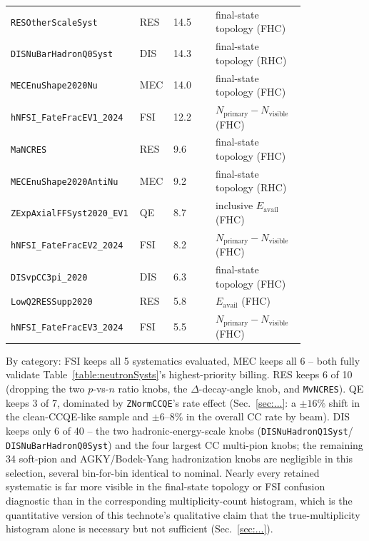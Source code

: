 \begin{table}[htbp]
\begin{tabular}{p{0.28\linewidth} p{0.10\linewidth} p{0.14\linewidth} p{0.30\linewidth}}
        \texttt{RESOtherScaleSyst}         & RES & 14.5  & final-state topology (FHC) \\
        \texttt{DISNuBarHadronQ0Syst}      & DIS & 14.3  & final-state topology (RHC) \\
        \texttt{MECEnuShape2020Nu}         & MEC & 14.0  & final-state topology (FHC) \\
        \texttt{hNFSI\_FateFracEV1\_2024}  & FSI & 12.2  & $N_{\mathrm{primary}}-N_{\mathrm{visible}}$ (FHC) \\
        \texttt{MaNCRES}                   & RES & 9.6   & final-state topology (FHC) \\
        \texttt{MECEnuShape2020AntiNu}     & MEC & 9.2   & final-state topology (RHC) \\
        \texttt{ZExpAxialFFSyst2020\_EV1}  & QE  & 8.7   & inclusive $E_{\mathrm{avail}}$ (FHC) \\
        \texttt{hNFSI\_FateFracEV2\_2024}  & FSI & 8.2   & $N_{\mathrm{primary}}-N_{\mathrm{visible}}$ (FHC) \\
        \texttt{DISvpCC3pi\_2020}          & DIS & 6.3   & final-state topology (FHC) \\
        \texttt{LowQ2RESSupp2020}          & RES & 5.8   & $E_{\mathrm{avail}}$ (FHC) \\
        \texttt{hNFSI\_FateFracEV3\_2024}  & FSI & 5.5   & $N_{\mathrm{primary}}-N_{\mathrm{visible}}$ (FHC) \\
        \bottomrule
    \end{tabular}
\end{table}

By category: FSI keeps all 5 systematics evaluated, MEC keeps all 6 --
both fully validate Table~\ref{table:neutronSysts}'s highest-priority
billing. RES keeps 6 of 10 (dropping the two $p$-vs-$n$ ratio knobs, the
$\Delta$-decay-angle knob, and \texttt{MvNCRES}). QE keeps 3 of 7,
dominated by \texttt{ZNormCCQE}'s rate effect (Sec.~\ref{sec:...}: a
$\pm16\%$ shift in the clean-CCQE-like sample and $\pm6$--$8\%$ in the
overall CC rate by beam). DIS keeps only 6 of 40 -- the two
hadronic-energy-scale knobs (\texttt{DISNuHadronQ1Syst}/
\texttt{DISNuBarHadronQ0Syst}) and the four largest CC multi-pion knobs;
the remaining 34 soft-pion and AGKY/Bodek-Yang hadronization knobs are
negligible in this selection, several bin-for-bin identical to nominal.
Nearly every retained systematic is far more visible in the final-state
topology or FSI confusion diagnostic than in the corresponding
multiplicity-count histogram, which is the quantitative version of this
technote's qualitative claim that the true-multiplicity histogram alone is
necessary but not sufficient (Sec.~\ref{sec:...}).
